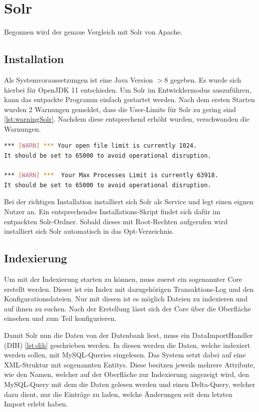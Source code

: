 
\section{Solr}

Begonnen wird der genaue Vergleich mit Solr von Apache.

\subsection{Installation}

Als Systemvoraussetzungen ist eine Java Version $> 8$ gegeben. Es wurde sich hierbei für OpenJDK 11 entschieden. Um Solr im Entwicklermodus auszuführen, kann das entpackte Programm einfach gestartet werden. 
Nach dem ersten Starten wurden 2 Warnungen gemeldet, dass die User-Limits für Solr zu gering sind \ref{lst:warningSolr}. Nachdem diese entsprechend erhöht wurden, verschwanden die Warnungen.

\begin{lstlisting}[language=bash, frame=single, label={lst:warningSolr}] 
*** [WARN] *** Your open file limit is currently 1024.
It should be set to 65000 to avoid operational disruption.

*** [WARN] ***  Your Max Processes Limit is currently 63918.
It should be set to 65000 to avoid operational disruption.
\end{lstlisting}

Bei der richtigen Installation installiert sich Solr als Service und legt einen eignen Nutzer an. Ein entsprechendes Installations-Skript findet sich dafür im entpackten Solr-Ordner. Sobald dieses mit Root-Rechten aufgerufen wird installiert sich Solr automatisch in das Opt-Verzeichnis.

\subsection{Indexierung}

Um mit der Indexierung starten zu können, muss zuerst ein sogenannter Core erstellt werden. Dieser ist ein Index mit dazugehörigen Transaktions-Log und den Konfigurationsdateien. Nur mit diesen ist es möglich Dateien zu indexieren und auf ihnen zu suchen. Nach der Erstellung lässt sich der Core über die Oberfläche einsehen und zum Teil konfigurieren.

Damit Solr nun die Daten von der Datenbank liest, muss ein DataImportHandler (DIH) \ref{lst:dih} geschrieben werden. In diesen werden die Daten, welche indexiert werden sollen, mit MySQL-Queries eingelesen. Das System setzt dabei auf eine XML-Struktur mit sogenannten Entitys. Diese besitzen jeweils mehrere Attribute, wie den Namen, welcher auf der Oberfläche zur Indexierung angezeigt wird, den MySQL-Query mit dem die Daten gelesen werden und einen Delta-Query, welcher dazu dient, nur die Einträge zu laden, welche Änderungen seit dem letzten Import erlebt haben. 

